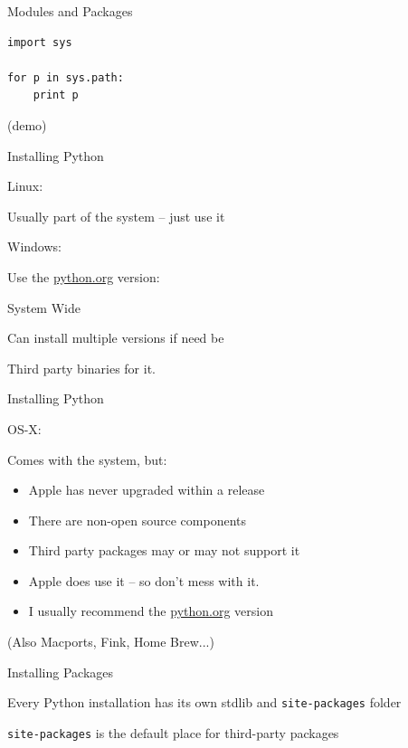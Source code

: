 \documentclass{beamer}
\begin{document}
\begin{frame}[fragile]{Modules and Packages}

\vfill
\begin{verbatim}
import sys

for p in sys.path:
    print p

\end{verbatim}

\vfill
(demo)
\end{frame} 

\begin{frame}[fragile]{Installing Python}

{\Large Linux:}

Usually part of the system -- just use it

\vfill
{\Large Windows:}

\vfill
Use the \url{python.org} version:

\vfill
System Wide

\vfill
Can install multiple versions if need be

\vfill
Third party binaries for it.

\end{frame} 

\begin{frame}[fragile]{Installing Python}

{\Large OS-X:}

Comes with the system, but:
\begin{itemize}
    \item Apple has never upgraded within a release
    \item There are non-open source components
    \item Third party packages may or may not support it
    \item Apple does use it -- so don't mess with it.
    \item I usually recommend the \url{python.org} version
\end{itemize}
(Also Macports, Fink, Home Brew...)

\vfill
\end{frame} 

\begin{frame}[fragile]{Installing Packages}

{\Large Every Python installation has its own stdlib and \verb|site-packages| folder}

\vfill
{\Large\verb|site-packages| is the default place for third-party packages}

\end{frame} 
\end{document}
